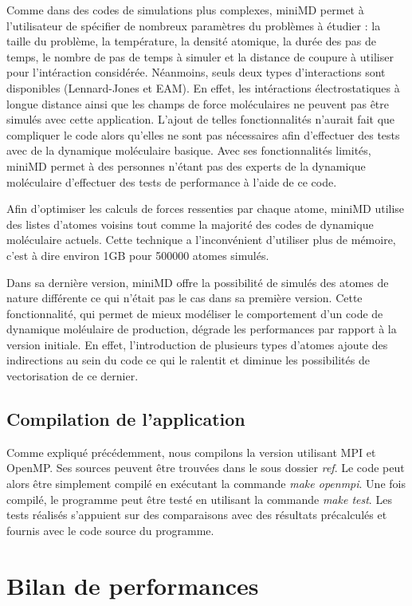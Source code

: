 \documentclass[11pt,a4paper]{article}
\begin{document}
	Comme dans des codes de simulations plus complexes, miniMD permet à l'utilisateur de spécifier de nombreux paramètres du problèmes à étudier : la taille du problème, la température, la densité atomique, la durée des pas de temps, le nombre de pas de temps à simuler et la distance de coupure à utiliser pour l'intéraction considérée. Néanmoins, seuls deux types d'interactions sont disponibles (Lennard-Jones et EAM). En effet, les intéractions électrostatiques à longue distance ainsi que les champs de force moléculaires ne peuvent pas être simulés avec cette application. L'ajout de telles fonctionnalités n'aurait fait que compliquer le code alors qu'elles ne sont pas nécessaires afin d'effectuer des tests avec de la dynamique moléculaire basique. Avec ses fonctionnalités limités, miniMD permet à des personnes n'étant pas des experts de la dynamique moléculaire d'effectuer des tests de performance à l'aide de ce code.

	Afin d'optimiser les calculs de forces ressenties par chaque atome, miniMD utilise des listes d'atomes voisins tout comme la majorité des codes de dynamique moléculaire actuels. Cette technique a l'inconvénient d'utiliser plus de mémoire, c'est à dire environ 1GB pour 500000 atomes simulés.

	Dans sa dernière version, miniMD offre la possibilité de simulés des atomes de nature différente ce qui n'était pas le cas dans sa première version. Cette fonctionnalité, qui permet de mieux modéliser le comportement d'un code de dynamique moléulaire de production, dégrade les performances par rapport à la version initiale. En effet, l'introduction de plusieurs types d'atomes ajoute des indirections au sein du code ce qui le ralentit et diminue les possibilités de vectorisation de ce dernier.

	\subsection{Compilation de l'application}
		Comme expliqué précédemment, nous compilons la version utilisant MPI et OpenMP. Ses sources peuvent être trouvées dans le sous dossier \textit{ref}. Le code peut alors être simplement compilé en exécutant la commande \textit{make openmpi}. Une fois compilé, le programme peut être testé en utilisant la commande \textit{make test}. Les tests réalisés s'appuient sur des comparaisons avec des résultats précalculés et fournis avec le code source du programme.
\section{Bilan de performances}
\end{document}
